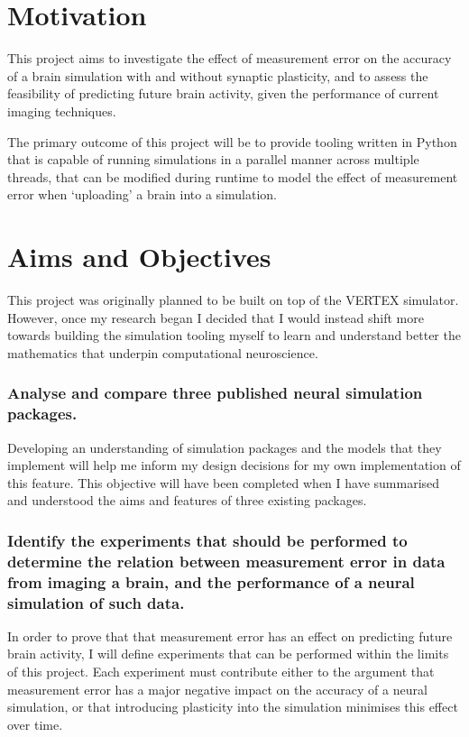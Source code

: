 \section{Motivation}

This project aims to investigate the effect of measurement error on the accuracy
of a brain simulation with and without synaptic plasticity, and to assess the
feasibility of predicting future brain activity, given the performance of
current imaging techniques.

The primary outcome of this project will be to provide tooling written in Python
that is capable of running simulations in a parallel manner across multiple
threads, that can be modified during runtime to model the effect of measurement
error when `uploading' a brain into a simulation.

\section{Aims and Objectives}

This project was originally planned to be built on top of the VERTEX simulator.
However, once my research began I decided that I would instead shift more
towards building the simulation tooling myself to learn and understand better
the mathematics that underpin computational neuroscience.

\subsubsection{Analyse and compare three published neural simulation packages.}

Developing an understanding of simulation packages and the models that they
implement will help me inform my design decisions for my own implementation of
this feature. This objective will have been completed when I have summarised and
understood the aims and features of three existing packages.


\subsubsection{Identify the experiments that should be performed to determine
      the relation between measurement error in data from imaging a brain, and the
      performance of a neural simulation of such data.}

In order to prove that that
measurement error has an effect on predicting future brain activity, I will
define experiments that can be performed within the limits of this project. Each
experiment must contribute either to the argument that measurement error has a
major negative impact on the accuracy of a neural simulation, or that
introducing plasticity into the simulation minimises this effect over time.


